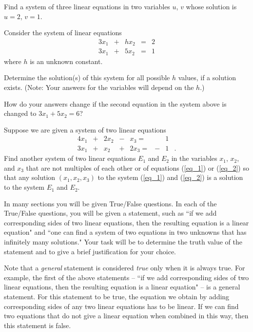 \item Find a system of three linear equations in two variables $u$, $v$ whose solution is $u=2$, $v=1$.

\item Consider the system of linear equations
\begin{alignat*}{3}
x_1 	& {}+{} & hx_2 & {}={} & 2 \\
3x_1 	& {}+{} & 5x_2 & {}={} & 1 
\end{alignat*}
where $h$ is an unknown constant. 
	\ba
	\item  Determine the solution(s) of this system for all possible $h$ values, if a solution exists. (Note: Your answers for the variables will depend on the $h$.)
	\item How do your answers change if the second equation in the system above is changed to $3x_1+5x_2=6$?\\
	
	\ea
	
\item Suppose we are given a system of two linear equations
\begin{alignat}{4}
x_1 	& {}+{} & 2x_2 	& {}-{} 	& x_3{}={} 	& { } &1&{} \label{eq_1} \\
3x_1 	& {}+{} & x_2 	& {}+{} 	& 2x_3{}={} 	& {-} &1&. \label{eq_2} 
\end{alignat}
Find another system of two linear equations $E_1$ and $E_2$ in the variables $x_1$, $x_2$, and $x_3$ that are not multiples of each other or of equations (\ref{eq_1}) or (\ref{eq_2}) so that any solution $(x_1, x_2, x_3)$ to the system (\ref{eq_1}) and (\ref{eq_2}) is a solution to the system $E_1$ and $E_2$. 

\ee


In many sections you will be given True/False questions. In each of the True/False questions, you will be given a statement, such as ``if we add corresponding sides of two linear equations, then the resulting equation is a linear equation" and ``one can find a system of two equations in two unknowns that has infinitely many solutions." Your task will be to determine the truth value of the statement and to give a brief justification for your choice.



Note that a {\em general} statement is considered {\em true} only when it is always true. For example, the first of the above statements -- ``if we add corresponding sides of two linear equations, then the resulting equation is a linear equation" -- is a general statement. For this statement to be true, the equation we obtain by adding corresponding sides of any two linear equations has to be linear. If we can find two equations that do not give a linear equation when combined in this way, then this statement is false.



